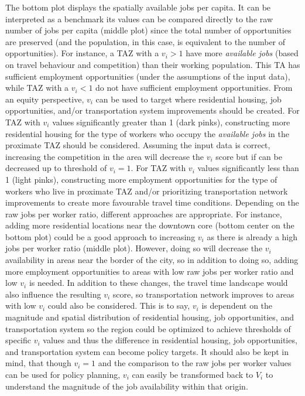 \documentclass[10pt,letterpaper]{article}
\begin{document}
The bottom plot displays the spatially available jobs per capita. It can
be interpreted as a benchmark its values can be compared directly to the
raw number of jobs per capita (middle plot) since the total number of
opportunities are preserved (and the population, in this case, is
equivalent to the number of opportunities). For instance, a TAZ with a
\(v_i > 1\) have more \emph{available jobs} (based on travel behaviour
and competition) than their working population. This TA has sufficient
employment opportunities (under the assumptions of the input data),
while TAZ with a \(v_i < 1\) do not have sufficient employment
opportunities. From an equity perspective, \(v_i\) can be used to target
where residential housing, job opportunities, and/or transportation
system improvements should be created. For TAZ with \(v_i\) values
significantly greater than 1 (dark pinks), constructing more residential
housing for the type of workers who occupy the \emph{available jobs} in
the proximate TAZ should be considered. Assuming the input data is
correct, increasing the competition in the area will decrease the
\(v_i\) score but if can be decreased up to threshold of \(v_i = 1\).
For TAZ with \(v_i\) values significantly less than 1 (light pinks),
constructing more employment opportunities for the type of workers who
live in proximate TAZ and/or prioritizing transportation network
improvements to create more favourable travel time conditions. Depending
on the raw jobs per worker ratio, different approaches are appropriate.
For instance, adding more residential locations near the downtown core
(bottom center on the bottom plot) could be a good approach to
increasing \(v_i\) as there is already a high jobs per worker ratio
(middle plot). However, doing so will decrease the \(v_i\) availability
in areas near the border of the city, so in addition to doing so, adding
more employment opportunities to areas with low raw jobs per worker
ratio and low \(v_i\) is needed. In addition to these changes, the
travel time landscape would also influence the resulting \(v_i\) score,
so transportation network improves to areas with low \(v_i\) could also
be considered. This is to say, \(v_i\) is dependent on the magnitude and
spatial distribution of residential housing, job opportunities, and
transportation system so the region could be optimized to achieve
thresholds of specific \(v_i\) values and thus the difference in
residential housing, job opportunities, and transportation system can
become policy targets. It should also be kept in mind, that though
\(v_i = 1\) and the comparison to the raw jobs per worker values can be
used for policy planning, \(v_i\) can easily be transformed back to
\(V_i\) to understand the magnitude of the job availability within that
origin.
\end{document}
